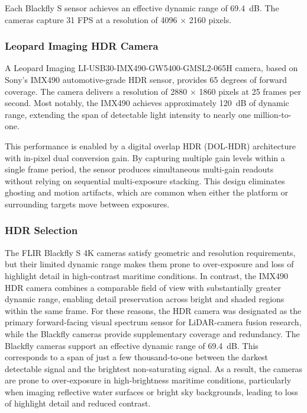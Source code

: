 \documentclass{erauthesis}
\begin{document}
Each Blackfly S sensor achieves an effective dynamic range of 69.4~dB.  
The cameras capture 31 \ac{FPS} at a resolution of 4096 $\times$ 2160 pixels.

\subsubsection{Leopard Imaging HDR Camera}

A Leopard Imaging LI-USB30-IMX490-GW5400-GMSL2-065H camera, based on Sony’s IMX490 automotive-grade HDR sensor, provides 65 degrees of forward coverage.  
The camera delivers a resolution of 2880 $\times$ 1860 pixels at 25 frames per second.  
Most notably, the IMX490 achieves approximately 120~dB of dynamic range, extending the span of detectable light intensity to nearly one million-to-one.  

This performance is enabled by a digital overlap HDR (DOL-HDR) architecture with in-pixel dual conversion gain.  
By capturing multiple gain levels within a single frame period, the sensor produces simultaneous multi-gain readouts without relying on sequential multi-exposure stacking.  
This design eliminates ghosting and motion artifacts, which are common when either the platform or surrounding targets move between exposures.  

\subsubsection{HDR Selection}

The FLIR Blackfly S 4K cameras satisfy geometric and resolution requirements, but their limited dynamic range makes them prone to over-exposure and loss of highlight detail in high-contrast maritime conditions.  
In contrast, the IMX490 HDR camera combines a comparable field of view with substantially greater dynamic range, enabling detail preservation across bright and shaded regions within the same frame.  
For these reasons, the HDR camera was designated as the primary forward-facing visual spectrum sensor for \ac{LiDAR}-camera fusion research, while the Blackfly cameras provide supplementary coverage and redundancy.  
The Blackfly cameras support an effective dynamic range of 69.4~dB.  
This corresponds to a span of just a few thousand-to-one between the darkest detectable signal and the brightest non-saturating signal.  
As a result, the cameras are prone to over-exposure in high-brightness maritime conditions, particularly when imaging reflective water surfaces or bright sky backgrounds, leading to loss of highlight detail and reduced contrast.  
\end{document}
